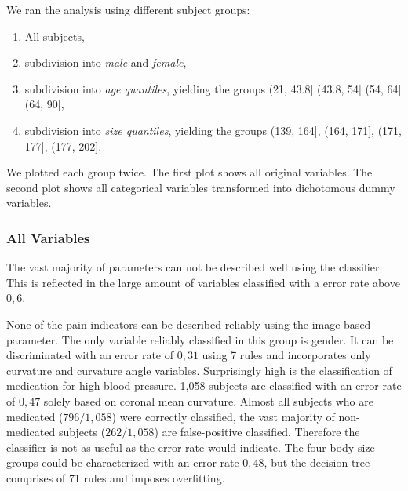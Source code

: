 \documentclass[a4paper,twoside]{style/article}
\begin{document}
We ran the analysis using different subject groups:
\begin{enumerate}
	\item All subjects,
	\item subdivision into \emph{male} and \emph{female},
	\item subdivision into \emph{age quantiles}, yielding the groups (21, 43.8] (43.8, 54] (54, 64] (64, 90],
	\item subdivision into \emph{size quantiles}, yielding the groups (139, 164], (164, 171], (171, 177], (177, 202].
\end{enumerate}
We plotted each group twice.
The first plot shows all original variables.
The second plot shows all categorical variables transformed into dichotomous dummy variables.

\subsubsection{All Variables}
The vast majority of parameters can not be described well using the classifier.
This is reflected in the large amount of variables classified with a error rate above $0,6$.

None of the pain indicators can be described reliably using the image-based parameter.
The only variable reliably classified in this group is gender.%
%
It can be discriminated with an error rate of $0,31$ using 7 rules and incorporates only curvature and curvature angle variables.
%
Surprisingly high is the classification of medication for high blood pressure.
1,058 subjects are classified with an error rate of $0,47$ solely based on coronal mean curvature.
Almost all subjects who are medicated ($796/1,058$) were correctly classified, the vast majority of non-medicated subjects ($262/1,058$) are false-positive classified.
Therefore the classifier is not as useful as the error-rate would indicate.
The four body size groups could be characterized with an error rate $0,48$, but the decision tree comprises of 71 rules and imposes overfitting.
\end{document}
